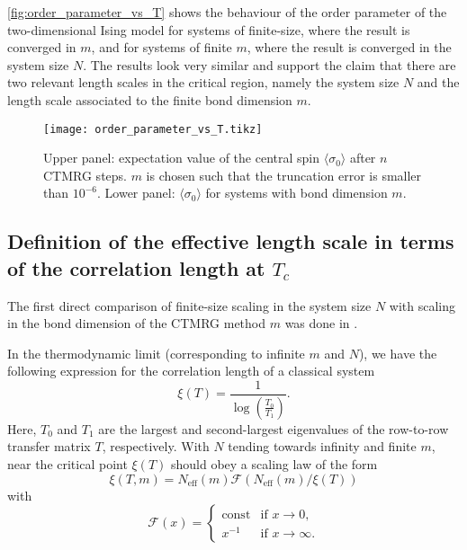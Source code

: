 \autoref{fig:order_parameter_vs_T} shows the behaviour of the order parameter of the
two-dimensional Ising model for systems of finite-size,
where the result is converged in $m$, and for systems of finite $m$, where
the result is converged in the system size $N$. The results look very similar and support
the claim that there are two relevant length scales in the critical region, namely the system size $N$ and
the length scale associated to the finite bond dimension $m$.

\begin{figure}
\texttt{[image: order\_parameter\_vs\_T.tikz]}
\caption{Upper panel: expectation value of the central spin $\langle \sigma_0 \rangle$
  after $n$ CTMRG steps. $m$ is chosen such that the truncation error is smaller than
  $10^{-6}$. Lower panel: $\langle \sigma_0 \rangle$ for systems with bond dimension $m$.}\label{fig:order_parameter_vs_T}
\end{figure}

\subsection{Definition of the effective length scale in terms of the correlation length at $T_c$}

The first direct comparison of finite-size scaling in the system size $N$ with scaling in
the bond dimension of the CTMRG method $m$ was done
in \cite{nishino1996numerical}.

In the thermodynamic limit (corresponding to infinite $m$ and $N$), we have the following
expression for the correlation length of a classical system
\cite{baxter1982exactly_correlation_length}
\begin{equation}
  \xi(T) = \frac{1}{\log\left(\frac{T_0}{T_1}\right)}.
\end{equation}
Here, $T_0$ and $T_1$ are the largest and second-largest eigenvalues of the row-to-row
transfer matrix $T$, respectively. With $N$ tending towards infinity and finite $m$, near
the critical point $\xi(T)$ should obey a scaling law of the form
\begin{equation}
  \xi(T, m) = N_{\text{eff}}(m) \mathcal{F}(N_{\text{eff}}(m) / \xi(T))
\end{equation}
with
\begin{equation}
  \mathcal{F}(x) = \begin{cases}
      \text{const} & \text{if } x \to 0, \\
      x^{-1} & \text{if } x \to \infty.
    \end{cases}
\end{equation}

